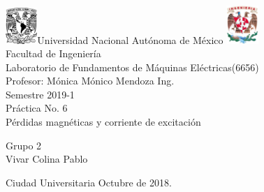 

     \begin{center}
	\includegraphics[width=0.09\textwidth]{UNAM}\Large Universidad Nacional Autónoma de México
        	\includegraphics[width=0.09\textwidth]{FI}\\[2cm]
        \Large Facultad de Ingeniería\\[2cm]
         \Large Laboratorio de Fundamentos de Máquinas Eléctricas(6656)\\[2cm]
         \footnotesize Profesor: 
         Mónica Mónico Mendoza Ing.\\[2cm]
        \footnotesize Semestre 2019-1\\[2cm]
        
       

        \Large Práctica No. 6\\[2cm]
        
           

\Large Pérdidas magnéticas y corriente de excitación
        
          \begin{flushright}
\footnotesize  Grupo 2\\[1cm]
\footnotesize Vivar Colina Pablo\\[0.5cm]
 \end{flushright}
          \begin{flushleft}
        \footnotesize Ciudad Universitaria Octubre de 2018.\\
          \end{flushleft}
         
          
   \end{center}
